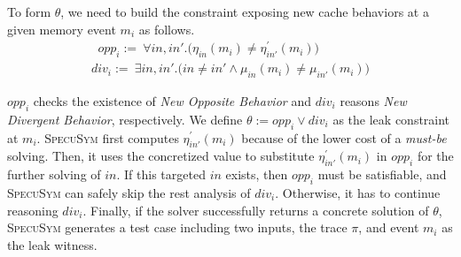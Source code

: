 \documentclass[sigconf]{acmart}
\newcommand\ignore[1]{}
\newcommand{\SpecuSym}{\textsc{SpecuSym} }
\begin{document}
To form $\theta$, we need to build the constraint exposing new cache behaviors
at a given memory event $\mathit{m_i}$ as follows.
%
\begin{multline}
  \label{eqn:new_behav}
  ~~~~~~~
  \mathit{opp_i}:=~
  \forall\mathit{in,in'}.
  \big(
  \mathit{\eta_{in}(m_i)\neq\eta_{in'}^\prime(m_i)}
  \big)
  ~~~~~~~~~~~~~~~~~~~~~~~
\end{multline}
%
\begin{multline}
  \label{eqn:new_behav}
  ~~~~~~~
  \mathit{div_i}:=~
  \exists\mathit{in,in'}.
  \big(
  \mathit{in\neq in'\wedge\mu_{in}(m_i) \neq \mu_{in'}(m_i)}
  \big)
  ~~~~~~~
\end{multline}
%
%
\ignore{
%
\begin{multline}
  \label{eqn:leak}
  ~~
  \theta:=
  \Big(
  \mathit{div_i}
  \wedge
  \big(
  \sum_{\scriptscriptstyle \mathit{k=0}}^{\scriptscriptstyle\mathit{n}} 
  \mathit{\eta_{in''}(m_k)=}0
  \neq
  \sum_{\scriptscriptstyle \mathit{k=0}}^{\scriptscriptstyle\mathit{n}} 
  \mathit{\eta_{in''}(m_k)=}1
  \big)
  \Big)
  \vee 
  \mathit{opp_i}
  ~~
\end{multline}
%
}
%
\ignore{
Note that 
speculative execution not only evicts cache lines to cause new misses but also loads 
memory data into cache that benefits new hits. Since a leak refers to the noticeable 
timing variance in program runs with and without speculative execution, from 
$\mathit{opp_i}$ the amount of new misses should differ from the amount of new hits. 
And we construct the final leak constraint $\theta$ on this observation:
}
%
%
$\mathit{opp_i}$ checks the existence of \textit{New Opposite Behavior} and 
$\mathit{div_i}$ reasons \textit{New Divergent Behavior}, respectively. We 
define $\theta:=\mathit{opp_i}\vee\mathit{div_i}$ as the leak constraint at 
$\mathit{m_i}$. \SpecuSym first computes $\mathit{\eta_{in'}^\prime(m_i)}$ 
because of the lower cost of a \textit{must-be} solving. Then, it uses the 
concretized value to substitute $\mathit{\eta_{in'}^\prime(m_i)}$ in 
$\mathit{opp_i}$ for the further solving of $\mathit{in}$. If this targeted 
$\mathit{in}$ exists, then $opp_i$ must be satisfiable, and \SpecuSym can 
safely skip the rest analysis of $\mathit{div_i}$. Otherwise, it has to 
continue reasoning $\mathit{div_i}$. Finally, if the solver successfully 
returns a concrete solution of $\theta$, \SpecuSym generates a test case 
including two inputs, the trace $\pi$, and event $\mathit{m_i}$ as the leak 
witness.
\end{document}
